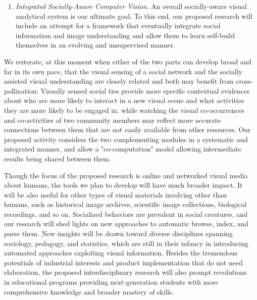 \begin{enumerate}
\item \vspace{-0.05in}\emph{Integrated Socially-Aware Computer Vision.} An overall socially-aware visual analytical system is our ultimate goal. To this end, our proposed research will include an attempt for a framework that eventually integrate social information and image understanding and allow them to learn self-build themselves in an evolving and unsupervised manner.
\end{enumerate}
We reiterate, at this moment when either of the two parts can develop broad and far in its own pace, that the visual sensing of a social network and the socially assisted visual understanding are closely related and both may benefit from cross-pollination: Visually sensed social ties provide more specific contextual evidences about who are more likely to interact in a new visual scene and what activities they are more likely to be engaged in, while watching the visual co-occurrences and co-activities of two community members may reflect more accurate connections between them that are not easily available from other resources. Our proposed activity considers the two complementing modules in a systematic and integrated manner, and allow a "co-computation" model allowing intermediate results being shared between them. 

Though the focus of the proposed research is online and networked visual media about humans, the tools we plan to develop will have much broader impact.  It will be also useful for other types of visual materials involving other than humans, such as historical image archives, scientific image collections, biological recordings, and so on. Socialized behaviors are prevalent in social creatures, and our research will shed lights on new approaches to automatic browse, index, and parse them. New insights will be drawn toward diverse disciplines spanning sociology, pedagogy, and statistics, which are still in their infancy in introducing automated approaches exploiting visual information. Besides the tremendous potentials of industrial interests and product implementation that do not need elaboration, the proposed interdisciplinary research will also prompt revolutions in educational programs providing next-generation students with more comprehensive knowledge and broader mastery of skills.